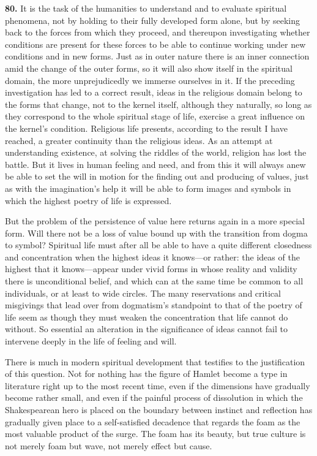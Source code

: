 \documentclass[12pt,a4paper]{book}
\newcommand{\opage}[1]{\marginnote{\footnotesize\textit{[#1]}}}
\begin{document}
\noindent\textbf{80.} It is the task of the humanities to understand and to evaluate spiritual phenomena,
not by holding to their fully developed form alone, but by seeking back to the forces from which they
proceed, and thereupon investigating whether conditions are present for these forces to be able to continue
working under new conditions and in new forms. Just as in outer nature there is an inner connection amid the
change of the outer forms, so it will also show itself in the spiritual domain, the more unprejudicedly we
immerse ourselves in it. If the preceding investigation has led to a correct result, ideas in the religious
domain belong to the forms that change, not to the kernel itself, although they naturally, so long as they
correspond to the whole spiritual stage of life, exercise a great influence on the kernel's condition.
Religious life presents, according to the result I have reached, a greater continuity than the religious
ideas. As an attempt at understanding existence, at solving the riddles of the world, religion has lost the
battle. But it lives in human feeling and need, and from this it will always anew be able to set the will in
motion for the finding out and producing of values, just as with the imagination's help it will be able to
form images and symbols in which the highest poetry of life is expressed.

But the problem of the persistence of value here returns again in a more special form. Will there not be a
loss of value bound up with the transition from dogma to symbol? Spiritual life must after all be able to
have a quite different closedness and concentration when the highest ideas it knows---or 
\opage{186}rather: the ideas of
the highest that it knows---appear under vivid forms in whose reality and validity there is unconditional
belief, and which can at the same time be common to all individuals, or at least to wide circles. The many
reservations and critical misgivings that lead over from dogmatism's standpoint to that of the poetry of life
seem as though they must weaken the concentration that life cannot do without. So essential an alteration in
the significance of ideas cannot fail to intervene deeply in the life of feeling and will.

There is much in modern spiritual development that testifies to the justification of this question. Not for
nothing has the figure of Hamlet become a type in literature right up to the most recent time, even if the
dimensions have gradually become rather small, and even if the painful process of dissolution in which the
Shakespearean hero is placed on the boundary between instinct and reflection has gradually given place to a
self-satisfied decadence that regards the foam as the most valuable product of the surge. The foam has its
beauty, but true culture is not merely foam but wave, not merely effect but cause.
\end{document}

